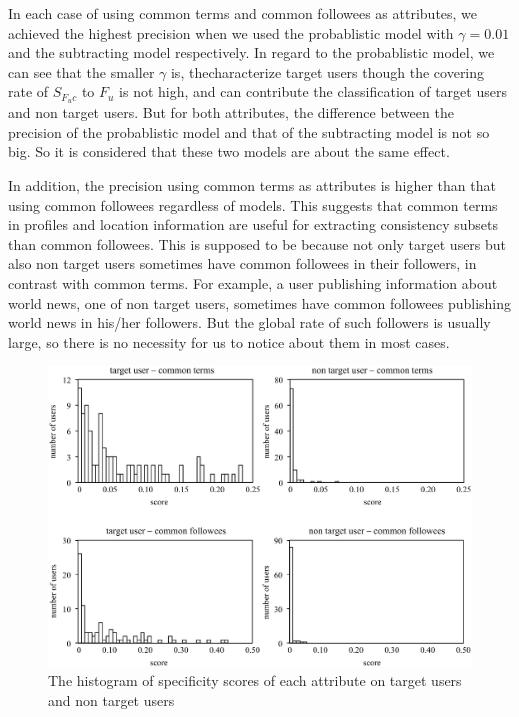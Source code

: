 In each case of using common terms and common followees as attributes,
we achieved the highest precision when we used the probablistic model
with $\gamma = 0.01$ and the subtracting model respectively.  In regard
to the probablistic model, we can see that the smaller $\gamma$ is,
thecharacterize target users though the covering rate of $S_{F_uc}$ to
$F_u$ is not high, and can contribute the classification of target users
and non target users.  But for both attributes, the difference between
the precision of the probablistic model and that of the subtracting
model is not so big.  So it is considered that these two models are
about the same effect.

In addition, the precision using common terms as attributes is higher
than that using common followees regardless of models.  This suggests
that common terms in profiles and location information are useful for
extracting consistency subsets than common followees.  This is supposed
to be because not only target users but also non target users sometimes
have common followees in their followers, in contrast with common terms.
For example, a user publishing information about world news, one of non
target users, sometimes have common followees publishing world news in
his/her followers.  But the global rate of such followers is usually
large, so there is no necessity for us to notice about them in most
cases.

{\footnotesize
\begin{figure}[t]
\begin{center}
\includegraphics[width=14cm]{images/histogram.eps}
 \caption{The histogram of specificity scores of each attribute on
 target users and non target users}
\label{fig:histogram}
\end{center}
\end{figure}
}


